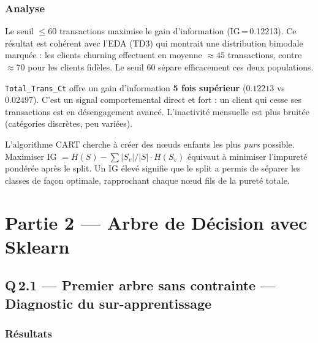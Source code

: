\documentclass[12pt,a4paper]{article}
\newcommand{\feature}[1]{\texttt{\small #1}}
\begin{document}
\subsubsection{Analyse}

\begin{reponsebox}
Le seuil $\leq 60$ transactions maximise le gain d'information (IG\,=\,0.12213).
Ce résultat est cohérent avec l'EDA (TD3) qui montrait une distribution bimodale marquée :
les clients churning effectuent en moyenne $\approx 45$ transactions, contre $\approx 70$
pour les clients fidèles. Le seuil 60 sépare efficacement ces deux populations.
\end{reponsebox}

\begin{reponsebox}
\feature{Total\_Trans\_Ct} offre un gain d'information \textbf{5 fois supérieur}
($0.12213$ vs $0.02497$). C'est un signal comportemental direct et fort : un client
qui cesse ses transactions est en désengagement avancé. L'inactivité mensuelle
est plus bruitée (catégories discrètes, peu variées).
\end{reponsebox}

\begin{reponsebox}
L'algorithme CART cherche à créer des nœuds enfants les plus \emph{purs} possible.
Maximiser IG $= H(S) - \sum |S_v|/|S| \cdot H(S_v)$ équivaut à minimiser l'impureté
pondérée après le split. Un IG élevé signifie que le split a permis de séparer les classes
de façon optimale, rapprochant chaque nœud fils de la pureté totale.
\end{reponsebox}

\section{Partie 2 — Arbre de Décision avec Sklearn}

\subsection{Q\,2.1 — Premier arbre sans contrainte — Diagnostic du sur-apprentissage}

\subsubsection{Résultats}
\end{document}
